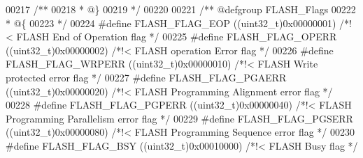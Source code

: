 \begin{DoxyCode}
00217 \textcolor{comment}{/**}
00218 \textcolor{comment}{  * @\}}
00219 \textcolor{comment}{  */}
00220 
00221 \textcolor{comment}{/** @defgroup FLASH\_Flags }
00222 \textcolor{comment}{  * @\{}
00223 \textcolor{comment}{  */}
00224 \textcolor{preprocessor}{#}\textcolor{preprocessor}{define} \textcolor{preprocessor}{FLASH\_FLAG\_EOP}                 \textcolor{preprocessor}{(}\textcolor{preprocessor}{(}\textcolor{preprocessor}{uint32\_t}\textcolor{preprocessor}{)}0x00000001\textcolor{preprocessor}{)}  \textcolor{comment}{/*!< FLASH End of Operation flag */}
00225 \textcolor{preprocessor}{#}\textcolor{preprocessor}{define} \textcolor{preprocessor}{FLASH\_FLAG\_OPERR}               \textcolor{preprocessor}{(}\textcolor{preprocessor}{(}\textcolor{preprocessor}{uint32\_t}\textcolor{preprocessor}{)}0x00000002\textcolor{preprocessor}{)}  \textcolor{comment}{/*!< FLASH operation Error flag */}
00226 \textcolor{preprocessor}{#}\textcolor{preprocessor}{define} \textcolor{preprocessor}{FLASH\_FLAG\_WRPERR}              \textcolor{preprocessor}{(}\textcolor{preprocessor}{(}\textcolor{preprocessor}{uint32\_t}\textcolor{preprocessor}{)}0x00000010\textcolor{preprocessor}{)}  \textcolor{comment}{/*!< FLASH Write protected error flag
       */}
00227 \textcolor{preprocessor}{#}\textcolor{preprocessor}{define} \textcolor{preprocessor}{FLASH\_FLAG\_PGAERR}              \textcolor{preprocessor}{(}\textcolor{preprocessor}{(}\textcolor{preprocessor}{uint32\_t}\textcolor{preprocessor}{)}0x00000020\textcolor{preprocessor}{)}  \textcolor{comment}{/*!< FLASH Programming Alignment error
       flag */}
00228 \textcolor{preprocessor}{#}\textcolor{preprocessor}{define} \textcolor{preprocessor}{FLASH\_FLAG\_PGPERR}              \textcolor{preprocessor}{(}\textcolor{preprocessor}{(}\textcolor{preprocessor}{uint32\_t}\textcolor{preprocessor}{)}0x00000040\textcolor{preprocessor}{)}  \textcolor{comment}{/*!< FLASH Programming Parallelism
       error flag  */}
00229 \textcolor{preprocessor}{#}\textcolor{preprocessor}{define} \textcolor{preprocessor}{FLASH\_FLAG\_PGSERR}              \textcolor{preprocessor}{(}\textcolor{preprocessor}{(}\textcolor{preprocessor}{uint32\_t}\textcolor{preprocessor}{)}0x00000080\textcolor{preprocessor}{)}  \textcolor{comment}{/*!< FLASH Programming Sequence error
       flag  */}
00230 \textcolor{preprocessor}{#}\textcolor{preprocessor}{define} \textcolor{preprocessor}{FLASH\_FLAG\_BSY}                 \textcolor{preprocessor}{(}\textcolor{preprocessor}{(}\textcolor{preprocessor}{uint32\_t}\textcolor{preprocessor}{)}0x00010000\textcolor{preprocessor}{)}  \textcolor{comment}{/*!< FLASH Busy flag */}

\end{DoxyCode}
